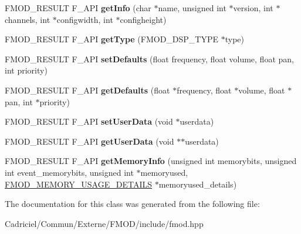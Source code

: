 \begin{DoxyCompactItemize}
\item 
F\+M\+O\+D\+\_\+\+R\+E\+S\+U\+LT F\+\_\+\+A\+PI {\bfseries get\+Info} (char $\ast$name, unsigned int $\ast$version, int $\ast$channels, int $\ast$configwidth, int $\ast$configheight)\hypertarget{class_f_m_o_d_1_1_d_s_p_a5bb61015d7b0e835437e46ea4eaf6442}{}\label{class_f_m_o_d_1_1_d_s_p_a5bb61015d7b0e835437e46ea4eaf6442}

\item 
F\+M\+O\+D\+\_\+\+R\+E\+S\+U\+LT F\+\_\+\+A\+PI {\bfseries get\+Type} (F\+M\+O\+D\+\_\+\+D\+S\+P\+\_\+\+T\+Y\+PE $\ast$type)\hypertarget{class_f_m_o_d_1_1_d_s_p_a7241c2669554667f90d4f2a576f64c4a}{}\label{class_f_m_o_d_1_1_d_s_p_a7241c2669554667f90d4f2a576f64c4a}

\item 
F\+M\+O\+D\+\_\+\+R\+E\+S\+U\+LT F\+\_\+\+A\+PI {\bfseries set\+Defaults} (float frequency, float volume, float pan, int priority)\hypertarget{class_f_m_o_d_1_1_d_s_p_a97919dbf4f783369b75f1bc43527489d}{}\label{class_f_m_o_d_1_1_d_s_p_a97919dbf4f783369b75f1bc43527489d}

\item 
F\+M\+O\+D\+\_\+\+R\+E\+S\+U\+LT F\+\_\+\+A\+PI {\bfseries get\+Defaults} (float $\ast$frequency, float $\ast$volume, float $\ast$pan, int $\ast$priority)\hypertarget{class_f_m_o_d_1_1_d_s_p_a80aa58e2f153dd3ad5fb6bf9305fc00e}{}\label{class_f_m_o_d_1_1_d_s_p_a80aa58e2f153dd3ad5fb6bf9305fc00e}

\item 
F\+M\+O\+D\+\_\+\+R\+E\+S\+U\+LT F\+\_\+\+A\+PI {\bfseries set\+User\+Data} (void $\ast$userdata)\hypertarget{class_f_m_o_d_1_1_d_s_p_a5aacd4725dbe50b725146bd6c412b0f4}{}\label{class_f_m_o_d_1_1_d_s_p_a5aacd4725dbe50b725146bd6c412b0f4}

\item 
F\+M\+O\+D\+\_\+\+R\+E\+S\+U\+LT F\+\_\+\+A\+PI {\bfseries get\+User\+Data} (void $\ast$$\ast$userdata)\hypertarget{class_f_m_o_d_1_1_d_s_p_a1b9014166d1ad45923da3227d8db3439}{}\label{class_f_m_o_d_1_1_d_s_p_a1b9014166d1ad45923da3227d8db3439}

\item 
F\+M\+O\+D\+\_\+\+R\+E\+S\+U\+LT F\+\_\+\+A\+PI {\bfseries get\+Memory\+Info} (unsigned int memorybits, unsigned int event\+\_\+memorybits, unsigned int $\ast$memoryused, \hyperlink{struct_f_m_o_d___m_e_m_o_r_y___u_s_a_g_e___d_e_t_a_i_l_s}{F\+M\+O\+D\+\_\+\+M\+E\+M\+O\+R\+Y\+\_\+\+U\+S\+A\+G\+E\+\_\+\+D\+E\+T\+A\+I\+LS} $\ast$memoryused\+\_\+details)\hypertarget{class_f_m_o_d_1_1_d_s_p_acac5f7f04e8e67719a712f848793e8f8}{}\label{class_f_m_o_d_1_1_d_s_p_acac5f7f04e8e67719a712f848793e8f8}

\end{DoxyCompactItemize}


The documentation for this class was generated from the following file\+:\begin{DoxyCompactItemize}
\item 
Cadriciel/\+Commun/\+Externe/\+F\+M\+O\+D/include/fmod.\+hpp\end{DoxyCompactItemize}
